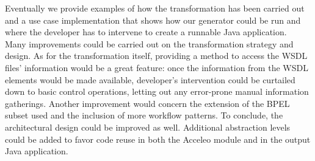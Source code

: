 Eventually we provide examples of how the transformation has been carried out and a use case implementation that shows how our generator could be run and where the developer has to intervene to create a runnable Java application. \\


Many improvements could be carried out on the transformation strategy and design. As for the transformation itself, providing a method to access the WSDL files' information would be a great feature: once the information from the WSDL elements would be made available, developer's intervention could be curtailed down to basic control operations, letting out any error-prone manual information gatherings.
Another improvement would concern the extension of the BPEL subset used and the inclusion of more workflow patterns.
To conclude, the architectural design could be improved as well. Additional abstraction levels could be added to favor code reuse in both the Acceleo module and in the output Java application. 


